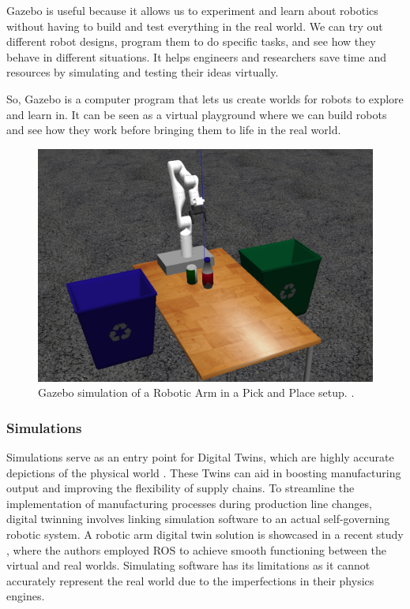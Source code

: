 \documentclass[12pt,oneside]{article}
\begin{document}
Gazebo is useful because it allows us to experiment and learn about robotics without having to build and test everything in the real world. We can try out different robot designs, program them to do specific tasks, and see how they behave in different situations. It helps engineers and researchers save time and resources by simulating and testing their ideas virtually.

So, Gazebo is a computer program that lets us create worlds for robots to explore and learn in. It can be seen as a virtual playground where we can build robots and see how they work before bringing them to life in the real world.

\begin{figure}[H]
\centering
\includegraphics[width=0.9\linewidth]{gazebo_robotic_arm}
\caption{Gazebo simulation of a Robotic Arm in a Pick and Place setup. \cite{mathworks2021}.}
\label{fig:gazeboroboticarm}
\end{figure}

\subsubsection{Simulations}
Simulations serve as an entry point for Digital Twins, which are highly accurate depictions of the physical world \cite{19_lu2020digital}. These Twins can aid in boosting manufacturing output and improving the flexibility of supply chains. To streamline the implementation of manufacturing processes during production line changes, digital twinning involves linking simulation software to an actual self-governing robotic system. A robotic arm digital twin solution is showcased in a recent study \cite{20_tavares2018flexible}, where the authors employed ROS \cite{21_ros} to achieve smooth functioning between the virtual and real worlds. Simulating software has its limitations as it cannot accurately represent the real world due to the imperfections in their physics engines. 
\end{document}
